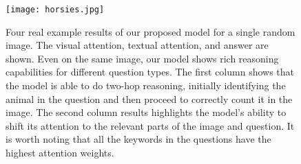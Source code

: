 \documentclass[times,twocolumn, final ,authoryear]{elsarticle}
\begin{document}
  
  \begin{figure}
  	\centering
  	\texttt{[image: horsies.jpg]}
  	
  	
  	
  	\caption{Four real example results of our proposed model for a single random image. The visual attention, textual attention, and answer are shown. Even on the same image, our model shows rich reasoning capabilities for different question types. The first column shows that the model is able to do two-hop reasoning, initially identifying the  animal in the question and then proceed to correctly count it in the image. The second column results highlights the model's ability to shift its attention to the relevant parts of the image and question. It is worth noting that all the keywords in the questions have the highest attention weights. }
  	\label{fig:vqa_horses}
  \end{figure}
  
\end{document}

